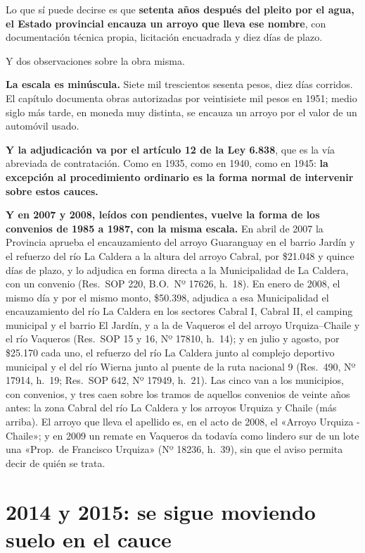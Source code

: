 Lo que sí puede decirse es que \textbf{setenta años después del pleito por el agua, el Estado
provincial encauza un arroyo que lleva ese nombre}, con documentación técnica propia,
licitación encuadrada y diez días de plazo.

Y dos observaciones sobre la obra misma.

\textbf{La escala es minúscula.} Siete mil trescientos sesenta pesos, diez días corridos. El
capítulo documenta obras autorizadas por veintisiete mil pesos en 1951; medio siglo más tarde, en moneda
muy distinta, se encauza un arroyo por el valor de un automóvil usado.

\textbf{Y la adjudicación va por el artículo 12 de la Ley 6.838}, que es la vía abreviada de
contratación. Como en 1935, como en 1940, como en 1945: \textbf{la excepción al procedimiento
ordinario es la forma normal de intervenir sobre estos cauces.}

\textbf{Y en 2007 y 2008, leídos con pendientes, vuelve la forma de los convenios de 1985 a 1987, con la misma escala.} En abril de 2007 la Provincia aprueba el encauzamiento del arroyo Guaranguay en el barrio Jardín y el refuerzo del río La Caldera a la altura del arroyo Cabral, por \$21.048 y quince días de plazo, y lo adjudica en forma directa a la Municipalidad de La Caldera, con un convenio (Res.\ SOP 220, B.O.\ Nº 17626, h.\ 18). En enero de 2008, el mismo día y por el mismo monto, \$50.398, adjudica a esa Municipalidad el encauzamiento del río La Caldera en los sectores Cabral I, Cabral II, el camping municipal y el barrio El Jardín, y a la de Vaqueros el del arroyo Urquiza--Chaile y el río Vaqueros (Res.\ SOP 15 y 16, Nº 17810, h.\ 14); y en julio y agosto, por \$25.170 cada uno, el refuerzo del río La Caldera junto al complejo deportivo municipal y el del río Wierna junto al puente de la ruta nacional 9 (Res.\ 490, Nº 17914, h.\ 19; Res.\ SOP 642, Nº 17949, h.\ 21). Las cinco van a los municipios, con convenios, y tres caen sobre los tramos de aquellos convenios de veinte años antes: la zona Cabral del río La Caldera y los arroyos Urquiza y Chaile (más arriba). El arroyo que lleva el apellido es, en el acto de 2008, el «Arroyo Urquiza - Chaile»; y en 2009 un remate en Vaqueros da todavía como lindero sur de un lote una «Prop.\ de Francisco Urquiza» (Nº 18236, h.\ 39), sin que el aviso permita decir de quién se trata.

\section{2014 y 2015: se sigue moviendo suelo en el cauce}

